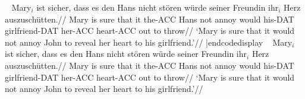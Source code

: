\vfil\eject
{}
\medskip

\codedisplay~
\ex
\begingl
\gla Mary$_i$ ist sicher, dass es den Hans nicht st\"oren
w\"urde seiner Freundin ihr$_i$ Herz auszusch\"utten.//
\glb Mary is sure that it the-ACC Hans not annoy would
his-DAT girlfriend-DAT her-ACC heart-ACC {out to throw}//
\glft  `Mary is sure that it would not annoy John to reveal her
heart to his girlfriend.'//
\endgl
\xe|endcodedisplay
\framedisplay~
\ex
\begingl
\gla Mary$_i$ ist sicher, dass es den Hans nicht st\"oren
w\"urde seiner Freundin ihr$_i$ Herz auszusch\"utten.//
\glb Mary is sure that it the-ACC Hans not annoy would
his-DAT girlfriend-DAT her-ACC heart-ACC {out to throw}//
\glft  `Mary is sure that it would not annoy John to reveal her
heart to his girlfriend.'//
\endgl
\xe
\endframedisplay
\endinput
\codedisplay
\ex
\begingl
\gla k- wapm -a -s'i -m -wapunin -uk //
\glb Cl V Agr Neg Agr Tns Agr //
\glb 2 see 3{\sc ACC} {} 2{\sc PL} preterit 3{\sc PL} //
\glft `you (pl) didn't see them'//
\endgl
\xe|endcodedisplay
\framedisplay~
\ex
\begingl
\gla k- wapm -a -s'i -m -wapunin -uk //
\glb Cl V Agr Neg Agr Tns Agr //
\glb 2 see 3{\sc ACC} {} 2{\sc PL} preterit 3{\sc PL} //
\glft `you (pl) didn't see them'//
\endgl
\xe
\endframedisplay

